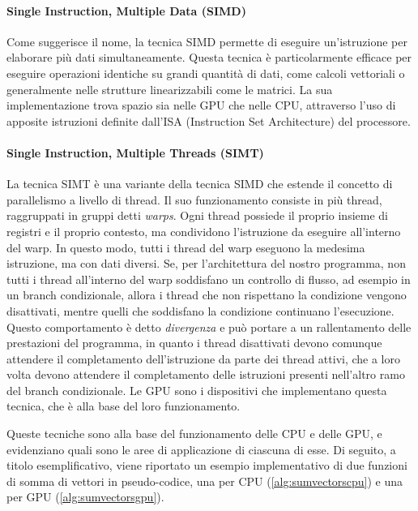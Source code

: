 \paragraph{Single Instruction, Multiple Data (SIMD)}
\label{para:simd}

Come suggerisce il nome, la tecnica SIMD permette di eseguire un'istruzione per
elaborare più dati simultaneamente. Questa tecnica è particolarmente efficace per
eseguire operazioni identiche su grandi quantità di dati, come calcoli
vettoriali o generalmente nelle strutture linearizzabili come le matrici. La sua
implementazione trova spazio sia nelle GPU che nelle CPU, attraverso l'uso di
apposite istruzioni definite dall'ISA (Instruction Set Architecture) del
processore.

\paragraph{Single Instruction, Multiple Threads (SIMT)\cite{generalpurposegpu}}
\label{para:simt}

La tecnica SIMT è una variante della tecnica SIMD che estende il concetto di
parallelismo a livello di thread. Il suo funzionamento consiste in più thread,
raggruppati in gruppi detti \textit{warps}. Ogni thread possiede il proprio
insieme di registri e il proprio contesto, ma condividono l'istruzione da eseguire
all'interno del warp. In questo modo, tutti i thread del warp eseguono la medesima
istruzione, ma con dati diversi. Se, per l'architettura del nostro programma, non
tutti i thread all'interno del warp soddisfano un controllo di flusso, ad
esempio in un branch condizionale, allora i thread che non rispettano la condizione
vengono disattivati, mentre quelli che soddisfano la condizione continuano l'esecuzione.
Questo comportamento è detto \textit{divergenza} e può portare a un
rallentamento delle prestazioni del programma, in quanto i thread disattivati devono
comunque attendere il completamento dell'istruzione da parte dei thread attivi,
che a loro volta devono attendere il completamento delle istruzioni presenti
nell'altro ramo del branch condizionale. Le GPU sono i dispositivi che implementano
questa tecnica, che è alla base del loro funzionamento.

\vspace{1em}

Queste tecniche sono alla base del funzionamento delle CPU e delle GPU, e
evidenziano quali sono le aree di applicazione di ciascuna di esse. Di seguito,
a titolo esemplificativo, viene riportato un esempio implementativo di due funzioni
di somma di vettori in pseudo-codice, una per CPU (\ref{alg:sumvectorscpu}) e
una per GPU (\ref{alg:sumvectorsgpu}).

